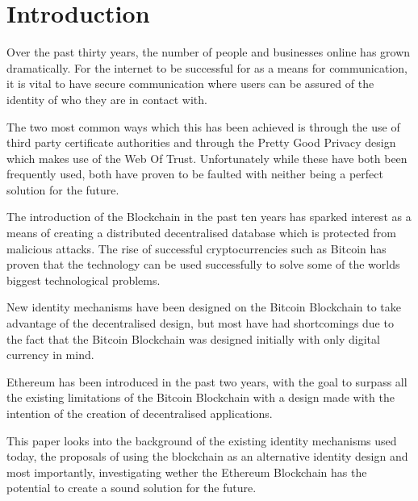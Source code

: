 \chapter{Introduction}
Over the past thirty years, the number of people and businesses online has grown dramatically. For the internet to be successful for as a means for communication, it is vital to have secure communication where users can be assured of the identity of who they are in contact with.

The two most common ways which this has been achieved is through the use of third party certificate authorities and through the Pretty Good Privacy design which makes use of the Web Of Trust. Unfortunately while these have both been frequently used, both have proven to be faulted with neither being a perfect solution for the future.

The introduction of the Blockchain in the past ten years has sparked interest as a means of creating a distributed decentralised database which is protected from malicious attacks. The rise of successful cryptocurrencies such as Bitcoin has proven that the technology can be used successfully to solve some of the worlds biggest technological problems.

New identity mechanisms have been designed on the Bitcoin Blockchain to take advantage of the decentralised design, but most have had shortcomings due to the fact that the Bitcoin Blockchain was designed initially with only digital currency in mind.

Ethereum has been introduced in the past two years, with the goal to surpass all the existing limitations of the Bitcoin Blockchain with a design made with the intention of the creation of decentralised applications.

This paper looks into the background of the existing identity mechanisms used today, the proposals of using the blockchain as an alternative identity design and most importantly, investigating wether the Ethereum Blockchain has the potential to create a sound solution for the future.

